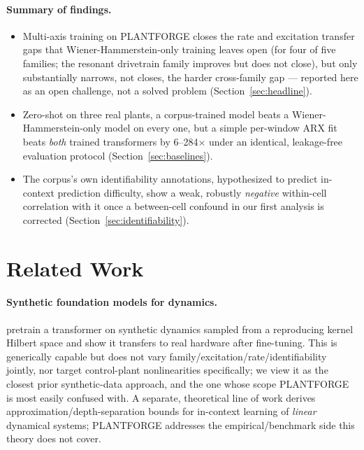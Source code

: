 \documentclass{article}
\begin{document}
\paragraph{Summary of findings.}
\begin{itemize}
  \item Multi-axis training on PLANTFORGE closes the rate and excitation transfer
  gaps that Wiener-Hammerstein-only training leaves open (for four of five
  families; the resonant drivetrain family improves but does not close), but
  only substantially narrows, not closes, the harder cross-family gap ---
  reported here as an open challenge, not a solved problem (Section~\ref{sec:headline}).
  \item Zero-shot on three real plants, a corpus-trained model beats a
  Wiener-Hammerstein-only model on every one, but a simple per-window ARX fit
  beats \emph{both} trained transformers by 6--284$\times$ under an
  identical, leakage-free evaluation protocol (Section~\ref{sec:baselines}).
  \item The corpus's own identifiability annotations, hypothesized to predict
  in-context prediction difficulty, show a weak, robustly \emph{negative}
  within-cell correlation with it once a between-cell confound in our first
  analysis is corrected (Section~\ref{sec:identifiability}).
\end{itemize}

\section{Related Work}
\label{sec:related}

\paragraph{Synthetic foundation models for dynamics.}
\citet{ziegler2024foundation} pretrain a transformer on synthetic dynamics
sampled from a reproducing kernel Hilbert space and show it transfers to
real hardware after fine-tuning. This is generically capable but does not
vary family/excitation/rate/identifiability jointly, nor target
control-plant nonlinearities specifically; we view it as the closest prior
synthetic-data approach, and the one whose scope PLANTFORGE is most easily
confused with. A separate, theoretical line of work \citep{cole2025incontext}
derives approximation/depth-separation bounds for in-context learning of
\emph{linear} dynamical systems; PLANTFORGE addresses the
empirical/benchmark side this theory does not cover.
\end{document}
